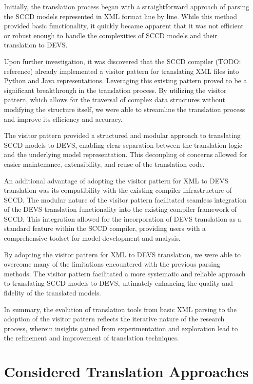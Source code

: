 Initially, the translation process began with a straightforward approach of parsing the SCCD models represented in XML format line by line. While this method provided basic functionality, it quickly became apparent that it was not efficient or robust enough to handle the complexities of SCCD models and their translation to DEVS.

Upon further investigation, it was discovered that the SCCD compiler (TODO: reference) already implemented a visitor pattern for translating XML files into Python and Java representations. Leveraging this existing pattern proved to be a significant breakthrough in the translation process. By utilizing the visitor pattern, which allows for the traversal of complex data structures without modifying the structure itself, we were able to streamline the translation process and improve its efficiency and accuracy.

The visitor pattern provided a structured and modular approach to translating SCCD models to DEVS, enabling clear separation between the translation logic and the underlying model representation. This decoupling of concerns allowed for easier maintenance, extensibility, and reuse of the translation code.

An additional advantage of adopting the visitor pattern for XML to DEVS translation was its compatibility with the existing compiler infrastructure of SCCD. The modular nature of the visitor pattern facilitated seamless integration of the DEVS translation functionality into the existing compiler framework of SCCD. This integration allowed for the incorporation of DEVS translation as a standard feature within the SCCD compiler, providing users with a comprehensive toolset for model development and analysis.

By adopting the visitor pattern for XML to DEVS translation, we were able to overcome many of the limitations encountered with the previous parsing methods. The visitor pattern facilitated a more systematic and reliable approach to translating SCCD models to DEVS, ultimately enhancing the quality and fidelity of the translated models.

In summary, the evolution of translation tools from basic XML parsing to the adoption of the visitor pattern reflects the iterative nature of the research process, wherein insights gained from experimentation and exploration lead to the refinement and improvement of translation techniques.



\section{Considered Translation Approaches}

